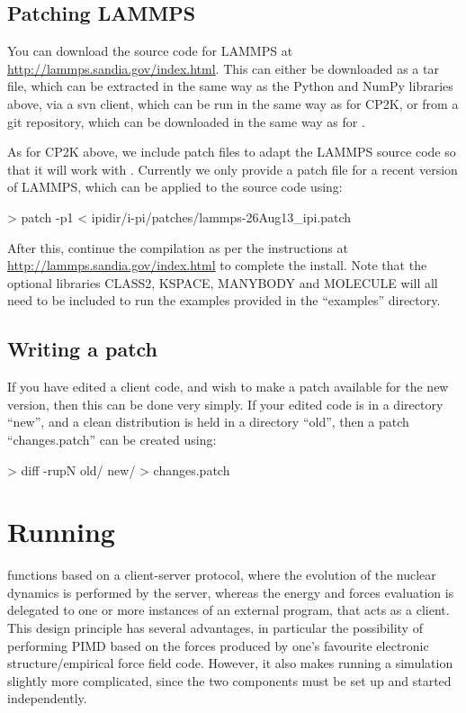 \documentclass[11pt,english,fleqn]{report}
\newenvironment{code}{%
\footnotesize 
\verbatim
}{
\endverbatim
\normalsize
}
\begin{document}
\subsection{Patching LAMMPS}

You can download the source code for LAMMPS at \url{http://lammps.sandia.gov/index.html}.
This can either be downloaded as a tar file, which
can be extracted in the same way as the Python and NumPy
libraries above, via a svn client, which can be run in the
same way as for CP2K, or from a git repository, which can be downloaded
in the same way as for \ipi. 

As for CP2K above, we include patch files to
adapt the LAMMPS source code so that it will work with \ipi.
Currently we only provide a patch file for a recent 
version of LAMMPS, which can be applied to the source code using:

\begin{code}
> patch -p1 < ipidir/i-pi/patches/lammps-26Aug13_ipi.patch
\end{code}

After this, continue the compilation as per the instructions at 
\url{http://lammps.sandia.gov/index.html} to complete the install.
Note that the optional libraries CLASS2, KSPACE, MANYBODY and 
MOLECULE will all need to be included to run the examples provided
in the {}``examples'' directory.

\subsection{Writing a patch}

If you have edited a client code, and wish to make a patch available
for the new version, then this can be done very simply.
If your edited code is in a directory {}``new'', and a clean
distribution is held in a directory {}``old'', then a patch
{}``changes.patch'' can be created using:

\begin{code}
> diff -rupN old/ new/ > changes.patch
\end{code}

\section{Running \ipi}

\ipi functions based on a client-server protocol, where the evolution of the nuclear dynamics
is performed by the \ipi server, whereas the energy and forces evaluation is delegated to 
one or more instances of an external program, that acts as a client. This design principle
has several advantages, in particular the possibility of performing PIMD based on the forces
produced by one's favourite electronic structure/empirical force field code. However, it 
also makes running a simulation slightly more complicated, since the two components
must be set up and started independently.
\end{document}
